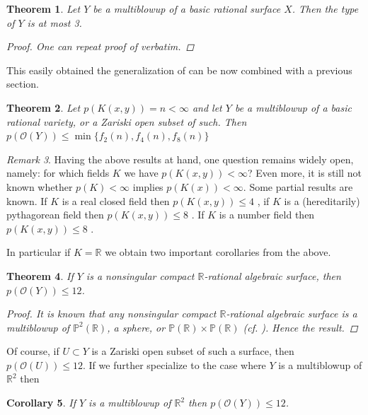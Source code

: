 \documentclass[12pt,reqno]{amsart}   	%
\newtheorem{thm}{Theorem}[section]
\newtheorem{cor}[thm]{Corollary}
\theoremstyle{obs}
\theoremstyle{prob}
\theoremstyle{conj}
\theoremstyle{remark}
\newtheorem{remark}[thm]{Remark}
\newcommand{\R}{\mathbb{R}}
\newcommand{\OO}{\mathcal{O}}
\begin{document}
\begin{thm}
Let $Y$ be a multiblowup of a basic rational surface $X$. Then the type of $Y$ is at most 3.
\begin{proof}
One can repeat proof of \cite[Theorem 1.1]{cssv2023} verbatim.
\end{proof}
\end{thm}

This easily obtained the generalization of \cite[Theorem 1.1]{cssv2023} can be now combined with a previous section. 

\begin{thm}
Let $p(K(x,y))=n<\infty$ and let $Y$ be a multiblowup of a basic rational variety, or a Zariski open subset of such. Then $p(\OO(Y))\leq \min \{f_2(n),f_4(n),f_8(n) \}$
\end{thm}

\begin{remark}
Having the above results at hand, one question remains widely open, namely: for which fields $K$ we have $p(K(x,y)) < \infty$? Even more, it is still not known whether $p(K)<\infty $ implies $p(K(x)) < \infty$. Some partial results are known. If $K$ is a real closed field then $p(K(x,y)) \leq 4$  \cite[Corollary 3.4]{pfister1995}, if $K$ is a (hereditarily) pythagorean field then $p(K(x,y)) \leq 8$ \cite{bdgmfz2023}. If $K$ is a number field then $p(K(x,y)) \leq 8$ \cite[Introduction]{bdgmfz2023}.

\end{remark}

In particular if $K=\R$ we obtain two important corollaries from the above.

\begin{thm}
If $Y$ is a nonsingular compact $\R$-rational algebraic surface, then $p(\OO(Y))\leq 12$.

\begin{proof}

It is known that any nonsingular compact $\R$-rational algebraic surface is a multiblowup of $\mathbb{P}^2(\R)$, a sphere, or $\mathbb{P}(\R)\times \mathbb{P}(\R)$ (cf. \cite[Theorem 3.1]{bh2007}). Hence the result.


\end{proof}
\end{thm}

Of course, if $ U\subset Y$ is a Zariski open subset of such a surface, then $p(\OO(U))\leq 12$. If we further specialize to the case where $Y$ is a multiblowup of $\R^2$ then

\begin{cor}
If $Y$ is a multiblowup of $\R^2$ then $p(\OO(Y)) \leq 12$.
\end{cor}
\end{document}
